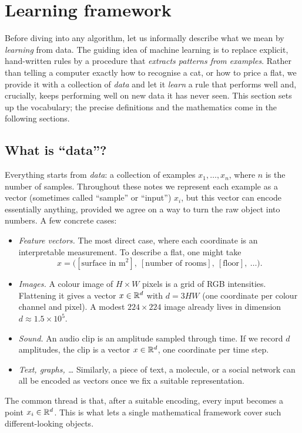 \section{Learning framework}

Before diving into any algorithm, let us informally describe what we mean by
\emph{learning} from data. The guiding idea of machine learning is to replace
explicit, hand-written rules by a procedure that \emph{extracts patterns from
examples}. Rather than telling a computer exactly how to recognise a cat, or how
to price a flat, we provide it with a collection of \emph{data} and let it
\emph{learn} a rule that performs well and, crucially, keeps performing
well on new data it has never seen. This section sets up the vocabulary; the
precise definitions and the mathematics come in the following sections.

\subsection{What is ``data''?}

Everything starts from \emph{data}: a collection of examples
$x_1, \dots, x_n$, where $n$ is the number of samples. Throughout these notes we
represent each example as a vector (sometimes called ``sample'' or ``input'') $x_i$, but this vector can encode
essentially anything, provided we agree on a way to turn the raw object into
numbers. A few concrete cases:
\begin{itemize}
    \item \emph{Feature vectors.} The most direct case, where each coordinate is
    an interpretable measurement. To describe a flat, one might take
    \[
    x = \big( [\text{surface in m}^2],\ [\text{number of rooms}],\ [\text{floor}],\ \dots \big) .
    \]
    \item \emph{Images.} A colour image of $H \times W$ pixels is a grid of RGB
    intensities. Flattening it gives a vector $x \in \mathbb{R}^d$ with $d = 3 H W$ (one
    coordinate per colour channel and pixel). A modest $224 \times 224$ image
    already lives in dimension $d \approx 1.5 \times 10^5$.
    \item \emph{Sound.} An audio clip is an amplitude sampled through time. If we
    record $d$ amplitudes, the clip is a vector $x \in \mathbb{R}^d$, one coordinate per time step.
    \item \emph{Text, graphs, \dots} Similarly, a piece of text, a molecule, or a
    social network can all be encoded as vectors once we fix a suitable
    representation.
\end{itemize}
The common thread is that, after a suitable encoding, every input becomes a
point $x_i \in \mathbb{R}^d$. This is what lets a single mathematical framework cover
such different-looking objects.

